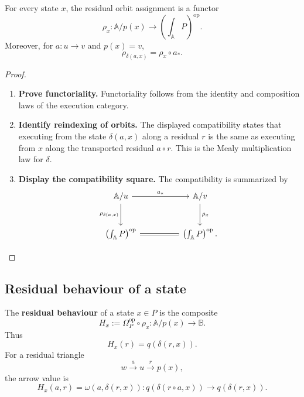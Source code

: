 \begin{proposition}
\label{prop:residual-orbit-functor}
    For every state \(x\), the residual orbit assignment is a functor
    \[
        \rho_x:\mathbb A/p(x)\to
        \left(\int_{\mathbb A}P\right)^{\mathrm{op}}.
    \]
    Moreover, for \(a:u\to v\) and \(p(x)=v\),
    \[
        \rho_{\delta(a,x)}=\rho_x\circ a_*.
    \]
\end{proposition}
\begin{proof}
    \leavevmode
    \begin{enumerate}
        \item \textbf{Prove functoriality.} Functoriality follows from the identity and composition laws of the execution category.

        \item \textbf{Identify reindexing of orbits.} The displayed compatibility states that executing from the state \(\delta(a,x)\) along a residual \(r\) is the same as executing from \(x\) along the transported residual \(a\circ r\). This is the Mealy multiplication law for \(\delta\).

        \item \textbf{Display the compatibility square.} The compatibility is summarized by
        \[
            \begin{tikzcd}[column sep=huge, row sep=large]
                    \mathbb A/u
                        \arrow[r, "a_*"]
                        \arrow[d, "\rho_{\delta(a,x)}"']
                &
                    \mathbb A/v
                        \arrow[d, "\rho_x"]
                \\
                    \left(\int_{\mathbb A}P\right)^{\mathrm{op}}
                        \arrow[r, equal]
                &
                    \left(\int_{\mathbb A}P\right)^{\mathrm{op}}.
            \end{tikzcd}
        \]
    \end{enumerate}
\end{proof}

\subsection{Residual behaviour of a state}
\label{subsec:residual-behaviour-of-state}

\begin{definition}
\label{def:residual-behaviour-of-state}
    The \textbf{residual behaviour} of a state \(x\in P\) is the composite
    \[
        H_x:=
        \Omega_P^{\mathrm{op}}\circ\rho_x:
        \mathbb A/p(x)\to\mathbb B.
    \]
    Thus
    \[
        H_x(r)=q(\delta(r,x)).
    \]
    For a residual triangle
    \[
        w\xrightarrow{a}u\xrightarrow{r}p(x),
    \]
    the arrow value is
    \[
        H_x(a,r)
        =
        \omega(a,\delta(r,x)):
        q(\delta(r\circ a,x))\to q(\delta(r,x)).
    \]
\end{definition}

